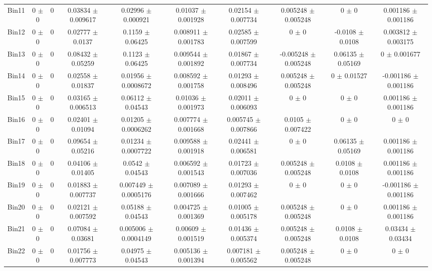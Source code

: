 \begin{tabular}{@{\extracolsep{4pt}}lccccccccc@{}}
     Bin11 & 0 $\pm$ 0 & 0 & 0.03834 $\pm$ 0.009617 & 0.02996 $\pm$ 0.000921 & 0.01037 $\pm$ 0.001928 & 0.02154 $\pm$ 0.007734 & 0.005248 $\pm$ 0.005248 & 0 $\pm$ 0 & 0.001186 $\pm$ 0.001186 \\ 
     Bin12 & 0 $\pm$ 0 & 0 & 0.02777 $\pm$ 0.0137 & 0.1159 $\pm$ 0.06425 & 0.008911 $\pm$ 0.001783 & 0.02585 $\pm$ 0.007599 & 0 $\pm$ 0 & -0.0108 $\pm$ 0.0108 & 0.003812 $\pm$ 0.003175 \\ 
     Bin13 & 0 $\pm$ 0 & 0 & 0.08432 $\pm$ 0.05259 & 0.1123 $\pm$ 0.06425 & 0.009544 $\pm$ 0.001892 & 0.01867 $\pm$ 0.007734 & -0.005248 $\pm$ 0.005248 & 0.06135 $\pm$ 0.05169 & 0 $\pm$ 0.001677 \\ 
     Bin14 & 0 $\pm$ 0 & 0 & 0.02558 $\pm$ 0.01837 & 0.01956 $\pm$ 0.0008672 & 0.008592 $\pm$ 0.001758 & 0.01293 $\pm$ 0.008496 & 0.005248 $\pm$ 0.005248 & 0 $\pm$ 0.01527 & -0.001186 $\pm$ 0.001186 \\ 
     Bin15 & 0 $\pm$ 0 & 0 & 0.03165 $\pm$ 0.006513 & 0.06112 $\pm$ 0.04543 & 0.01036 $\pm$ 0.001973 & 0.02011 $\pm$ 0.006093 & 0 $\pm$ 0 & 0 $\pm$ 0 & 0.001186 $\pm$ 0.001186 \\ 
     Bin16 & 0 $\pm$ 0 & 0 & 0.02401 $\pm$ 0.01094 & 0.01205 $\pm$ 0.0006262 & 0.007774 $\pm$ 0.001668 & 0.005745 $\pm$ 0.007866 & 0.0105 $\pm$ 0.007422 & 0 $\pm$ 0 & 0 $\pm$ 0 \\ 
     Bin17 & 0 $\pm$ 0 & 0 & 0.09654 $\pm$ 0.05216 & 0.01234 $\pm$ 0.0007722 & 0.009588 $\pm$ 0.001918 & 0.02441 $\pm$ 0.006581 & 0 $\pm$ 0 & 0.06135 $\pm$ 0.05169 & 0.001186 $\pm$ 0.001186 \\ 
     Bin18 & 0 $\pm$ 0 & 0 & 0.04106 $\pm$ 0.01405 & 0.0542 $\pm$ 0.04543 & 0.006592 $\pm$ 0.001543 & 0.01723 $\pm$ 0.007036 & 0.005248 $\pm$ 0.005248 & 0.0108 $\pm$ 0.0108 & 0.001186 $\pm$ 0.001186 \\ 
     Bin19 & 0 $\pm$ 0 & 0 & 0.01883 $\pm$ 0.007737 & 0.007449 $\pm$ 0.0005176 & 0.007089 $\pm$ 0.001666 & 0.01293 $\pm$ 0.007462 & 0 $\pm$ 0 & 0 $\pm$ 0 & -0.001186 $\pm$ 0.001186 \\ 
     Bin20 & 0 $\pm$ 0 & 0 & 0.02121 $\pm$ 0.007592 & 0.05188 $\pm$ 0.04543 & 0.004725 $\pm$ 0.001369 & 0.01005 $\pm$ 0.005178 & 0.005248 $\pm$ 0.005248 & 0 $\pm$ 0 & 0.001186 $\pm$ 0.001186 \\ 
     Bin21 & 0 $\pm$ 0 & 0 & 0.07084 $\pm$ 0.03681 & 0.005006 $\pm$ 0.0004149 & 0.00609 $\pm$ 0.001519 & 0.01436 $\pm$ 0.005374 & 0.005248 $\pm$ 0.005248 & 0.0108 $\pm$ 0.0108 & 0.03434 $\pm$ 0.03434 \\ 
     Bin22 & 0 $\pm$ 0 & 0 & 0.01756 $\pm$ 0.007773 & 0.04975 $\pm$ 0.04543 & 0.005136 $\pm$ 0.001394 & 0.007181 $\pm$ 0.005562 & 0.005248 $\pm$ 0.005248 & 0 $\pm$ 0 & 0 $\pm$ 0 \\ 

\end{tabular}
